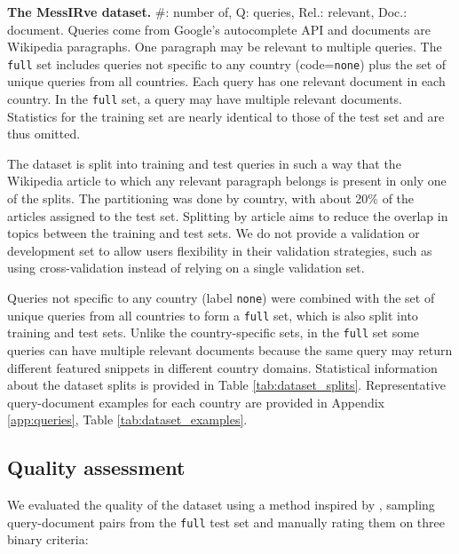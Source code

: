 \documentclass[11pt]{article}
\begin{document}
\begin{table}[ht]
  \centering
  
  \caption{\textbf{The MessIRve dataset.}
    \#: number of, Q: queries, Rel.: relevant, Doc.: document. Queries come from Google's autocomplete API and documents are Wikipedia paragraphs. One paragraph may be relevant to multiple queries. The \texttt{full} set includes queries not specific to any country (code=\texttt{none}) plus the set of unique queries from all countries. Each query has one relevant document in each country. In the \texttt{full} set, a query may have multiple relevant documents. Statistics for the training set are nearly identical to those of the test set and are thus omitted.
  }
  \label{tab:dataset_splits}
\end{table}


The dataset is split into training and test queries in such a way that the Wikipedia article to which any relevant paragraph belongs is present in only one of the splits. The partitioning was done by country, with about 20\% of the articles assigned to the test set. Splitting by article aims to reduce the overlap in topics between the training and test sets. We do not provide a validation or development set to allow users flexibility in their validation strategies, such as using cross-validation instead of relying on a single validation set.

Queries not specific to any country (label \texttt{none}) were combined with the set of unique queries from all countries to form a \texttt{full} set, which is also split into training and test sets. 
Unlike the country-specific sets, in the \texttt{full} set some queries can have multiple relevant documents because the same query may return different featured snippets in different country domains. 
Statistical information about the dataset splits is provided in Table \ref{tab:dataset_splits}.
Representative query-document examples for each country are provided in Appendix \ref{app:queries}, Table \ref{tab:dataset_examples}.

\subsection{Quality assessment} \label{sec:quality_assessment}

We evaluated the quality of the dataset using a method inspired by \citet{rybak-2023-maupqa}, sampling query-document pairs from the \texttt{full} test set and manually rating them on three binary criteria:
\end{document}
